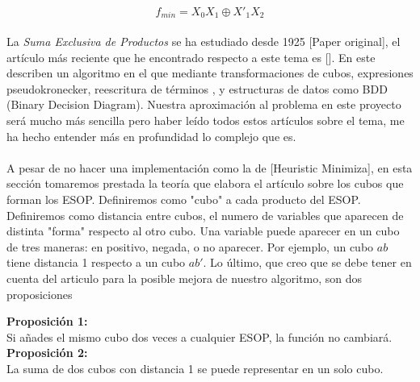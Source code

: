 \[f_{min} = X_0X_1 \oplus X'_1X_2\]
\\
La \textit{Suma Exclusiva de Productos} se ha estudiado desde 1925 [Paper original], el artículo más reciente que he encontrado respecto a este tema es []. En este describen un algoritmo en el que mediante transformaciones de cubos, expresiones pseudokronecker, reescritura de términos \cite{brand1993minimization}, y estructuras de datos como BDD (Binary Decision Diagram). Nuestra aproximación al problema en este proyecto será mucho más sencilla pero haber leído todos estos artículos sobre el tema, me ha hecho entender más en profundidad lo complejo que es.
\\\\
A pesar de no hacer una implementación como la de [Heuristic Minimiza], en esta sección tomaremos prestada la teoría que elabora el artículo sobre los cubos que forman los ESOP. Definiremos como "cubo" a cada producto del ESOP. Definiremos como distancia entre cubos, el numero de variables que aparecen de distinta "forma" respecto al otro cubo. Una variable puede aparecer en un cubo de tres maneras: en positivo, negada, o no aparecer. Por ejemplo, un cubo $ab$ tiene distancia 1 respecto a un cubo $ab'$. Lo último, que creo que se debe tener en cuenta del articulo para la posible mejora de nuestro algoritmo, son dos proposiciones 
\begin{tcolorbox}
\textbf{Proposición 1:}\\
Si añades el mismo cubo dos veces a cualquier ESOP, la función no cambiará. \\
\textbf{Proposición 2:}\\
La suma de dos cubos con distancia 1 se puede representar en un solo cubo. 
\end{tcolorbox}





